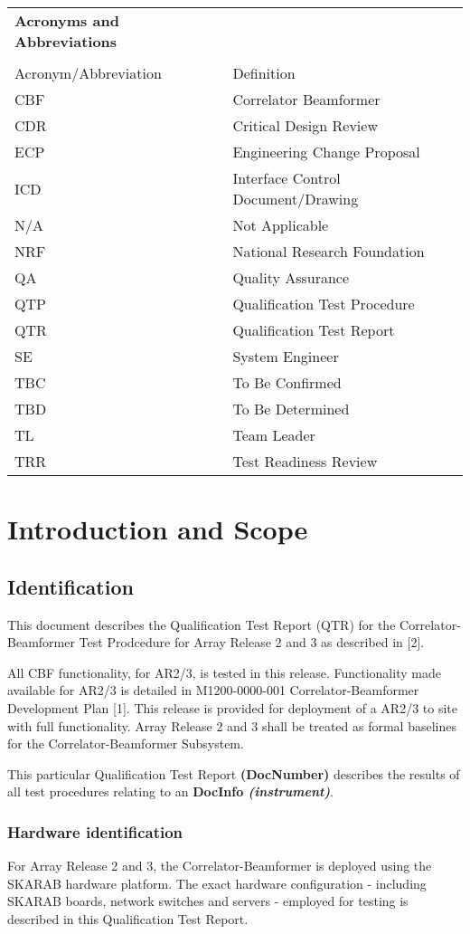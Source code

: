 \begin{longtable}{ll}
	{\bf\LARGE Acronyms and Abbreviations} & \\\\
	Acronym/Abbreviation & Definition \\
	CBF & Correlator Beamformer \\
	CDR & Critical Design Review \\
	ECP & Engineering Change Proposal \\
	ICD & Interface Control Document/Drawing \\
	N/A & Not Applicable \\
	NRF & National Research Foundation \\
	QA  & Quality Assurance \\
	QTP & Qualification Test Procedure \\
	QTR & Qualification Test Report \\
	SE  & System Engineer \\
	TBC & To Be Confirmed \\
	TBD & To Be Determined \\
	TL  & Team Leader \\
	TRR & Test Readiness Review \\
\end{longtable}

\chapter{Introduction and Scope}
\section{Identification}
This document describes the Qualification Test Report (QTR) for the Correlator-Beamformer Test Prodcedure for Array Release 2 and 3 as described in [2].\newline

All CBF functionality, for AR2/3, is tested in this release. Functionality made available for AR2/3 is detailed in M1200-0000-001 Correlator-Beamformer Development Plan [1]. This release is provided for deployment of a AR2/3 to site with full functionality. Array Release 2 and 3 shall be treated as formal baselines for the Correlator-Beamformer Subsystem.\newline

This particular Qualification Test Report {\bf (DocNumber)} describes the results of all test procedures relating to an {\bf DocInfo \it{(instrument)}}.
\subsection{Hardware identification}
For Array Release 2 and 3, the Correlator-Beamformer is deployed using the SKARAB hardware platform. The exact hardware configuration - including SKARAB boards, network switches and servers - employed for testing is described in this Qualification Test Report.
